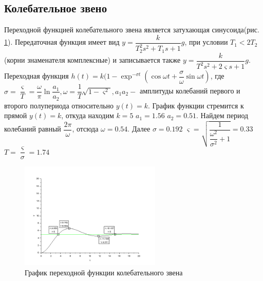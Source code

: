 \documentclass[a4paper,12pt,russian]{article} %
\begin{document}
\subsection{Колебательное звено}
Переходной функцией колебательного звена является затухающая синусоида(рис. \ref{plot_kol}). Передаточная функция имеет вид $y=\dfrac{k}{T_2^2s^2+T_1s+1}g$, при условии $T_1<2T_2$ (корни знаменателя комплексные) и записывается также $y=\dfrac{k}{T^2s^2+2\varsigma s+1}g$. 
Переходная функция $h(t)=k(1-\exp^{-\sigma t}(\cos \omega t + \dfrac{\sigma}{\omega}\sin \omega t)$, где $\sigma=\dfrac{\varsigma}{T}=\dfrac{\omega}{\pi}\ln\dfrac{a_1}{a_2}, \omega=\dfrac{1}{T}\sqrt{1-\varsigma^2}, a_1 a_2-$ амплитуды колебаний первого и второго полупериода относительно $y(t)=k$. График функции стремится к прямой $y(t)=k$, откуда находим  $k=5$ $a_1=1.56 $ $a_2=0.51 $. Найдем период колебаний равный $\dfrac{2 \pi}{\omega}$, отсюда $\omega=0.54$. 
Далее $\sigma=0.192 $ $\varsigma=\sqrt{\dfrac{1}{\dfrac{\omega^2}{\sigma^2}+1}}=0.33 $ $T=\dfrac{\varsigma}{\sigma}=1.74$
\begin{figure}[H]
	\centering\includegraphics[width=0.6\textwidth]{plot_kol.png}
	\caption{График переходной функции колебательного звена}\label{plot_kol}
\end{figure}
\end{document}
